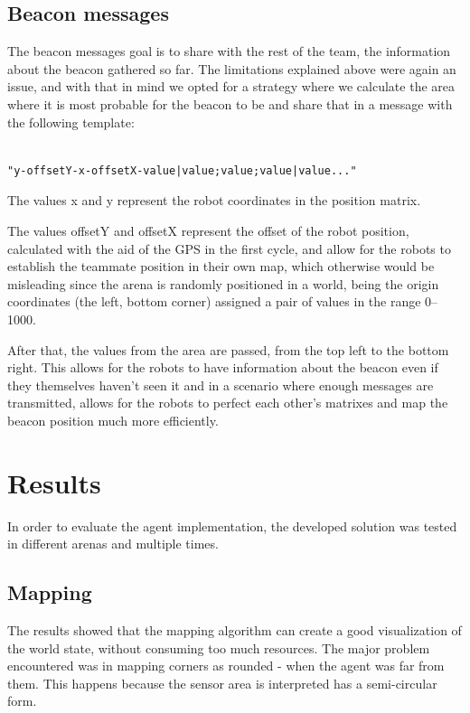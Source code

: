 \documentclass[oribibl]{llncs}
\begin{document}
\subsection{Beacon messages}

The beacon messages goal is to share with the rest of the team, the information about the beacon gathered so far. The limitations explained above were again an issue, and with that in mind we opted for a strategy where we calculate the area where it is most probable for the beacon to be and share that in a message with the following template:

\begin{verbatim}

"y-offsetY-x-offsetX-value|value;value;value|value..."

\end{verbatim}

The values x and y represent the robot coordinates in the position matrix.

The values offsetY and offsetX represent the offset of the robot position, calculated with the aid of the GPS in the first cycle, and allow for the robots to establish the teammate position in their own map, which otherwise would be misleading since the arena is randomly positioned in a world, being the origin coordinates (the left, bottom corner) assigned a pair of values in the range 0–1000.

After that, the values from the area are passed, from the top left to the bottom right.
This allows for the robots to have information about the beacon even if they themselves haven’t seen it and in a scenario where enough messages are transmitted, allows for the robots to perfect each other’s matrixes and map the beacon position much more efficiently.


\section{Results}

In order to evaluate the agent implementation, the developed solution was tested in different arenas and multiple times.

\subsection{Mapping}

The results showed that the mapping algorithm can create a good visualization of the world state, without consuming too much resources. The major problem encountered was in mapping corners as rounded - when the agent was far from them. This happens because the sensor area is interpreted has a semi-circular form. 
\end{document}
